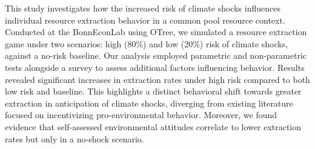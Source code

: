 This study investigates how the increased risk of climate shocks influences individual resource extraction behavior in a common pool resource context. Conducted at the BonnEconLab using OTree, we simulated a resource extraction game under two scenarios: high (80\%) and low (20\%) risk of climate shocks, against a no-risk baseline. Our analysis employed parametric and non-parametric tests alongside a survey to assess additional factors influencing behavior. Results revealed significant increases in extraction rates under high risk compared to both low risk and baseline. %
This highlights a distinct behavioral shift towards greater extraction in anticipation of climate shocks, diverging from existing literature focused on incentivizing pro-environmental behavior.
Moreover, we found evidence that self-assessed environmental attitudes correlate to lower extraction rates but only in a no-shock scenario.
